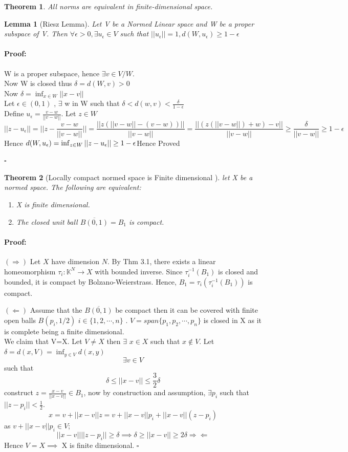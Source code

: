\documentclass{article}
\newenvironment{proof}{\paragraph{Proof:}}{\hfill$\square$}
\newtheorem{theorem}{Theorem}[section]
\newtheorem{lemma}{Lemma}[section]
\begin{document}
\begin{theorem}
    All norms are equivalent in finite-dimensional space.
\end{theorem}
\begin{lemma}[Riesz Lemma]
    Let V be a Normed Linear space and W be a proper subspace of V. Then $\forall \epsilon > 0 , \exists u_{\epsilon} \in V$ such that $||u_{\epsilon }|| = 1, d(W,u_{\epsilon})\geq 1-\epsilon $

\end{lemma}
\begin{proof}
    W is a proper subspace, hence $\exists v \in V/W$.\\
    Now W is closed thus $\delta = d(W,v) >0$
    \\Now $\delta = \inf_{x \in W} ||x-v||$
\\ Let $\epsilon \in (0,1)$ , $\exists$ w in W such that $\delta < d(w,v) < \frac{\delta}{1-\epsilon}$ \\
Define $u_{\epsilon } = \frac{v-w}{||v-w||}$. Let $z \in W$
$$||z-u_{\epsilon }|| = ||z- \frac{v-w}{||v-w||}|| = \frac{||z(||v-w|| -(v-w))||}{||v-w||} = \frac{||(z(||v-w||)+w) -v||}{||v-w||}\geq \frac{\delta}{||v-w||} \geq 1-\epsilon$$
Hence $d(W,u_{\epsilon}) = \inf_{z \in W} ||z-u_{\epsilon} || \geq 1-\epsilon \\ $Hence Proved 

\end{proof}
\begin{theorem}[Locally compact normed space is Finite dimensional ]
    let X be a normed space. The following are equivalent:
    \begin{enumerate}
        \item X is finite dimensional.
        \item The closed unit ball $\overline{B(0,1)}=B_1 $ is compact. 
    \end{enumerate}
    
\end{theorem}
\begin{proof}
   $\mathbf{(\Rightarrow) }$ Let $X$ have dimension $N$. By Thm 3.1, there exists a linear homeomorphism $\tau_i : \mathbb{K}^N \to X$ with bounded inverse. Since $\tau_i^{-1}(B_1)$ is closed and bounded, it is compact by Bolzano-Weierstrass. Hence, $B_1 = \tau_i(\tau_i^{-1}(B_1))$ is compact.

$(\Leftarrow )$ Assume that the $\overline{B(0,1)}$ be compact then it can be covered with finite open balls $B(p_i,1/2)$ $i \in \{ 1,2,\cdots ,n\}$ . $V = span\{p_1,p_2, \cdots, p_n \}$ is closed in X as it is complete being a finite dimensional. \\
We claim that V=X. Let $V\not= X$ then $\exists$ $x\in X$ such that $x\notin V$. Let $\delta= d(x,V)= \inf_{y\in V} d(x,y)$ $$\exists v \in V$$ such that $$\delta \leq ||x-v|| \leq \frac{3}{2} \delta$$
construct $z=\frac{x-v}{||x-v||} \in B_1$, now by construction and assumption, $\exists p_i $ such that $||z-p_i||<\frac{1}{2}$. $$x= v+||x-v||z= v+||x-v||p_i+ ||x-v||(z-p_i) $$
as $v+||x-v|| p_{i} \in V$;$$||x-v||||z-p_i||\geq \delta  \implies \delta \geq ||x-v||\geq 2\delta \Rightarrow \Leftarrow $$ Hence $V=X \implies $ X is finite dimensional.
\end{proof}
\end{document}
